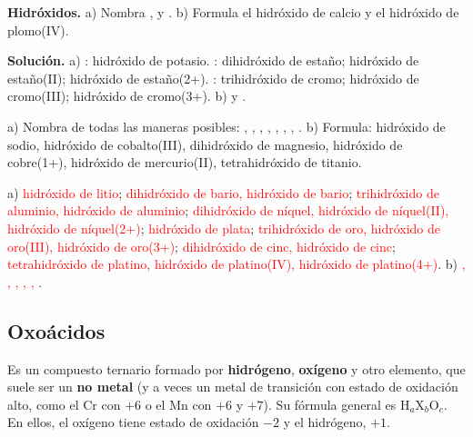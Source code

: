 \begin{example}
    \textbf{Hidróxidos.} a) Nombra ,  y . b) Formula el hidróxido de calcio y el hidróxido de
    plomo(IV).

    \textbf{Solución.} a) : hidróxido de potasio. : dihidróxido de estaño; hidróxido de estaño(II);
    hidróxido de estaño(2+). : trihidróxido de cromo; hidróxido de cromo(III); hidróxido de cromo(3+).
    b)  y .
\end{example}

\begin{exercise}
    a) Nombra de todas las maneras posibles: , , , , , ,
    , . b) Formula: hidróxido de sodio, hidróxido de cobalto(III), dihidróxido de magnesio, hidróxido
    de cobre(1+), hidróxido de mercurio(II), tetrahidróxido de titanio.
    \begin{solu}
        a) \textcolor{red}{hidróxido de litio}; \textcolor{red}{dihidróxido de bario, hidróxido de bario};
        \textcolor{red}{trihidróxido de aluminio, hidróxido de aluminio}; \textcolor{red}{dihidróxido de níquel, hidróxido de
        níquel(II), hidróxido de níquel(2+)}; \textcolor{red}{hidróxido de plata}; \textcolor{red}{trihidróxido de oro,
        hidróxido de oro(III), hidróxido de oro(3+)}; \textcolor{red}{dihidróxido de cinc, hidróxido de cinc};
        \textcolor{red}{tetrahidróxido de platino, hidróxido de platino(IV), hidróxido de platino(4+)}.
        b) \textcolor{red}{, , , , , }.
    \end{solu}
\end{exercise}

\subsection{Oxoácidos}\label{sec:ud5-oxoacidos}

\begin{definition}[Oxoácido]
    Es un compuesto ternario formado por \textbf{hidrógeno}, \textbf{oxígeno} y otro elemento, que suele ser un \textbf{no
    metal} (y a veces un metal de transición con estado de oxidación alto, como el Cr con \(+6\) o el Mn con \(+6\) y \(+7\)).
    Su fórmula general es \(\mathrm{H}_a\mathrm{X}_b\mathrm{O}_c\). En ellos, el oxígeno tiene estado de oxidación \(-2\) y el hidrógeno, \(+1\).
\end{definition}

